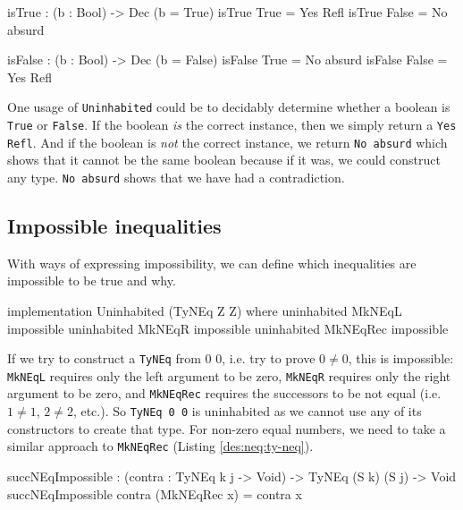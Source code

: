         \begin{code}[caption={Using \texttt{absurd}}]
        isTrue : (b : Bool) -> Dec (b = True)
        isTrue True  = Yes Refl
        isTrue False = No absurd
        
        isFalse : (b : Bool) -> Dec (b = False)
        isFalse True  = No absurd
        isFalse False = Yes Refl
        \end{code}
        
        One usage of \texttt{Uninhabited} could be to decidably determine whether a boolean is \texttt{True} or \texttt{False}. If the boolean \textit{is} the correct instance, then we simply return a \texttt{Yes Refl}. And if the boolean is \textit{not} the correct instance, we return \texttt{No absurd} which shows that it cannot be the same boolean because if it was, we could construct any type. \texttt{No absurd} shows that we have had a contradiction.
    
    \subsection{Impossible inequalities}
        With ways of expressing impossibility, we can define which inequalities are impossible to be true and why.
        \begin{code}[label={des:neq-uninh}, caption={Not equals cannot be constructed on 0 0}]
        implementation Uninhabited (TyNEq Z Z) where
            uninhabited MkNEqL   impossible
            uninhabited MkNEqR   impossible
            uninhabited MkNEqRec impossible
        \end{code}
    
        If we try to construct a \texttt{TyNEq} from 0 0, i.e. try to prove $0 \neq 0$, this is impossible: \texttt{MkNEqL} requires only the left argument to be zero, \texttt{MkNEqR} requires only the right argument to be zero, and \texttt{MkNEqRec} requires the successors to be not equal (i.e. $1 \neq 1$, $2 \neq 2$, etc.). So \texttt{TyNEq 0 0} is uninhabited as we cannot use any of its constructors to create that type. For non-zero equal numbers, we need to take a similar approach to \texttt{MkNEqRec} (Listing \ref{des:neq:ty-neq}).
        
        \begin{code}[label={des:neq-sneqimp}, caption={Proving inequality of numbers is impossible}]
        succNEqImpossible : (contra : TyNEq k j -> Void) ->
                            TyNEq (S k) (S j) -> Void   
        succNEqImpossible contra (MkNEqRec x) = contra x
        \end{code}
    
